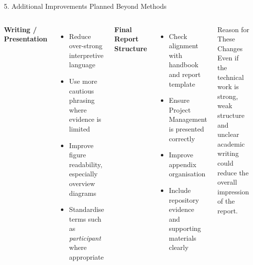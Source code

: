\documentclass[aspectratio=169, 11pt]{beamer}
\begin{document}
\begin{frame}[shrink=7]{5. Additional Improvements Planned Beyond Methods}

    \begin{columns}[T]
        \textbf{Writing / Presentation}
        \begin{itemize}
            \item Reduce over-strong interpretive language
            \item Use more cautious phrasing where evidence is limited
            \item Improve figure readability, especially overview diagrams
            \item Standardise terms such as \textit{participant} where appropriate
        \end{itemize}

        \textbf{Final Report Structure}
        \begin{itemize}
            \item Check alignment with handbook and report template
            \item Ensure Project Management is presented correctly
            \item Improve appendix organisation
            \item Include repository evidence and supporting materials clearly
        \end{itemize}

        \vspace{2mm}
        \begin{alertblock}{Reason for These Changes}
            Even if the technical work is strong, weak structure and unclear academic writing could reduce the overall impression of the report.
        \end{alertblock}
    \end{columns}
\end{frame}
\end{document}
